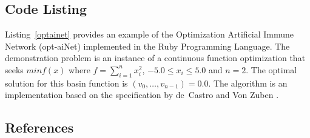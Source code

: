 \subsection{Code Listing}
Listing~\ref{optainet} provides an example of the Optimization Artificial Immune Network (opt-aiNet) implemented in the Ruby Programming Language.
The demonstration problem is an instance of a continuous function optimization that seeks $min f(x)$ where $f=\sum_{i=1}^n x_{i}^2$, $-5.0\leq x_i \leq 5.0$ and $n=2$. The optimal solution for this basin function is $(v_0,\ldots,v_{n-1})=0.0$.
The algorithm is an implementation based on the specification by de~Castro and Von Zuben \cite{Castro2002c}.



\subsection{References}

% 
% 
